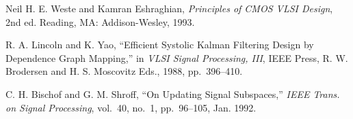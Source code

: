 \documentclass[journal]{IEEEtran}
\begin{document}

\begin{thebibliography}{99}

   Neil H. E. Weste and Kamran Eshraghian, {\it Principles
  of CMOS VLSI Design}, 2nd ed. Reading, MA: Addison-Wesley, 1993.

   R. A. Lincoln and K. Yao, ``Efficient Systolic Kalman
  Filtering Design by Dependence Graph Mapping,'' in {\it VLSI Signal
  Processing, III}, IEEE Press, R. W. Brodersen and H. S. Moscovitz Eds.,
  1988, pp.~396--410.

   C. H. Bischof and G. M. Shroff, ``On Updating Signal
  Subspaces,'' {\it IEEE Trans. on Signal Processing}, vol.~40, no.~1,
  pp.~96--105, Jan. 1992.

\end{thebibliography}
\end{document}
